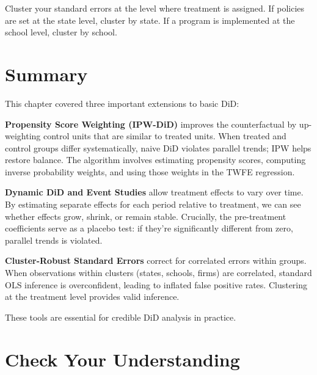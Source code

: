 \documentclass[
  letterpaper,
  DIV=11,
  numbers=noendperiod]{scrreprt}
\begin{document}
\begin{tcolorbox}[enhanced jigsaw, arc=.35mm, bottomrule=.15mm, bottomtitle=1mm, breakable, colback=white, colbacktitle=quarto-callout-tip-color!10!white, colframe=quarto-callout-tip-color-frame, coltitle=black, left=2mm, leftrule=.75mm, opacityback=0, opacitybacktitle=0.6, rightrule=.15mm, title=\textcolor{quarto-callout-tip-color}{\faLightbulb}\hspace{0.5em}{Rule of Thumb: Cluster at the Treatment Level}, titlerule=0mm, toprule=.15mm, toptitle=1mm]

Cluster your standard errors at the level where treatment is assigned.
If policies are set at the state level, cluster by state. If a program
is implemented at the school level, cluster by school.

\end{tcolorbox}

\section{Summary}\label{summary-8}

This chapter covered three important extensions to basic DiD:

\textbf{Propensity Score Weighting (IPW-DiD)} improves the
counterfactual by up-weighting control units that are similar to treated
units. When treated and control groups differ systematically, naive DiD
violates parallel trends; IPW helps restore balance. The algorithm
involves estimating propensity scores, computing inverse probability
weights, and using those weights in the TWFE regression.

\textbf{Dynamic DiD and Event Studies} allow treatment effects to vary
over time. By estimating separate effects for each period relative to
treatment, we can see whether effects grow, shrink, or remain stable.
Crucially, the pre-treatment coefficients serve as a placebo test: if
they're significantly different from zero, parallel trends is violated.

\textbf{Cluster-Robust Standard Errors} correct for correlated errors
within groups. When observations within clusters (states, schools,
firms) are correlated, standard OLS inference is overconfident, leading
to inflated false positive rates. Clustering at the treatment level
provides valid inference.

These tools are essential for credible DiD analysis in practice.

\section{Check Your Understanding}\label{check-your-understanding-11}
\end{document}
